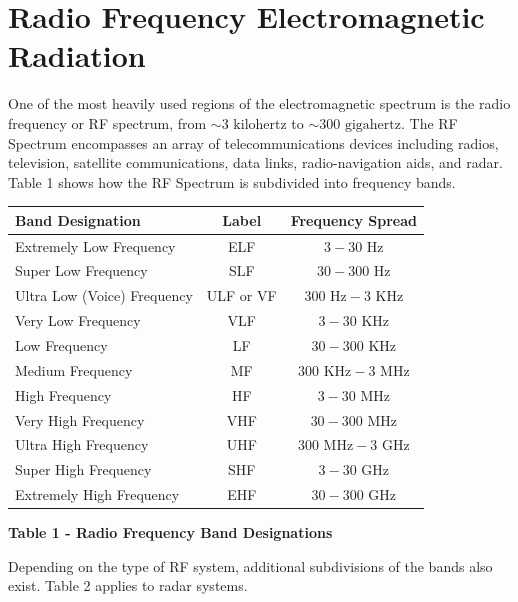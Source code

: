 \documentclass[
]{book}
\begin{document}
\hypertarget{radio-frequency-electromagnetic-radiation}{%
\section{Radio Frequency Electromagnetic Radiation}\label{radio-frequency-electromagnetic-radiation}}

One of the most heavily used regions of the electromagnetic spectrum is the
radio frequency or RF spectrum, from \(\sim 3 \text{ kilohertz}\) to
\(\sim 300 \text{ gigahertz}\). The RF Spectrum encompasses an array of
telecommunications devices including radios, television, satellite
communications, data links, radio-navigation aids, and radar. Table 1 shows how
the RF Spectrum is subdivided into frequency bands.

\begin{longtable}[]{@{}lcc@{}}
\toprule
\textbf{Band Designation} & \textbf{Label} & \textbf{Frequency Spread}\tabularnewline
\midrule
\endhead
Extremely Low Frequency & ELF & \(3 - 30 \text{ Hz}\)\tabularnewline
Super Low Frequency & SLF & \(30 - 300 \text{ Hz}\)\tabularnewline
Ultra Low (Voice) Frequency & ULF or VF & \(300 \text{ Hz} - 3 \text{ KHz}\)\tabularnewline
Very Low Frequency & VLF & \(3 - 30 \text{ KHz}\)\tabularnewline
Low Frequency & LF & \(30 - 300 \text{ KHz}\)\tabularnewline
Medium Frequency & MF & \(300 \text{ KHz} - 3 \text{ MHz}\)\tabularnewline
High Frequency & HF & \(3 - 30 \text{ MHz}\)\tabularnewline
Very High Frequency & VHF & \(30 - 300 \text{ MHz}\)\tabularnewline
Ultra High Frequency & UHF & \(300 \text{ MHz} - 3 \text{ GHz}\)\tabularnewline
Super High Frequency & SHF & \(3 - 30 \text{ GHz}\)\tabularnewline
Extremely High Frequency & EHF & \(30 - 300 \text{ GHz}\)\tabularnewline
\bottomrule
\end{longtable}

\textbf{Table 1 - Radio Frequency Band Designations}

Depending on the type of RF system, additional subdivisions of the bands also
exist. Table 2 applies to radar systems.
\end{document}
